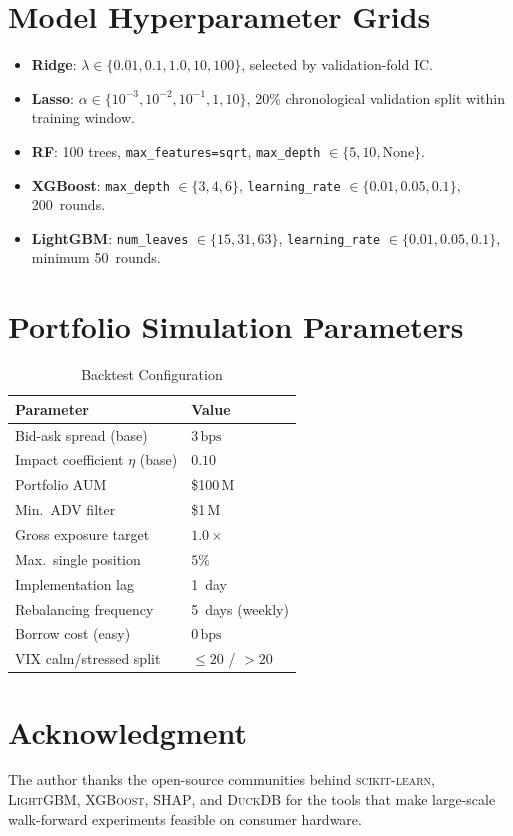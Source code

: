 \documentclass[journal]{IEEEtran}
\newcommand{\bps}{\,\mathrm{bps}}
\begin{document}
\section{Model Hyperparameter Grids}
\label{app:hpgrids}

\begin{itemize}
  \item \textbf{Ridge}: $\lambda \in \{0.01, 0.1, 1.0, 10, 100\}$, selected by validation-fold IC.
  \item \textbf{Lasso}: $\alpha \in \{10^{-3}, 10^{-2}, 10^{-1}, 1, 10\}$,
        20\% chronological validation split within training window.
  \item \textbf{RF}: 100 trees, \texttt{max\_features=\textquotesingle sqrt\textquotesingle},
        \texttt{max\_depth} $\in \{5, 10, \text{None}\}$.
  \item \textbf{XGBoost}: \texttt{max\_depth} $\in \{3, 4, 6\}$,
        \texttt{learning\_rate} $\in \{0.01, 0.05, 0.1\}$, 200~rounds.
  \item \textbf{LightGBM}: \texttt{num\_leaves} $\in \{15, 31, 63\}$,
        \texttt{learning\_rate} $\in \{0.01, 0.05, 0.1\}$, minimum 50~rounds.
\end{itemize}

\section{Portfolio Simulation Parameters}
\label{app:params}

\begin{table}[h]
\centering
\caption{Backtest Configuration}
\label{tab:params}
\begin{tabular}{ll}
\toprule
Parameter & Value \\
\midrule
Bid-ask spread (base) & $3\bps$ \\
Impact coefficient $\eta$ (base) & $0.10$ \\
Portfolio AUM & \$100\,M \\
Min.\ ADV filter & \$1\,M \\
Gross exposure target & $1.0\times$ \\
Max.\ single position & $5\%$ \\
Implementation lag & 1~day \\
Rebalancing frequency & 5~days (weekly) \\
Borrow cost (easy) & $0\bps$ \\
VIX calm/stressed split & $\leq 20$ / $> 20$ \\
\bottomrule
\end{tabular}
\end{table}

\section*{Acknowledgment}
The author thanks the open-source communities behind
\textsc{scikit-learn}, \textsc{LightGBM}, \textsc{XGBoost},
\textsc{SHAP}, and \textsc{DuckDB} for the tools that make
large-scale walk-forward experiments feasible on consumer hardware.



\end{document}
